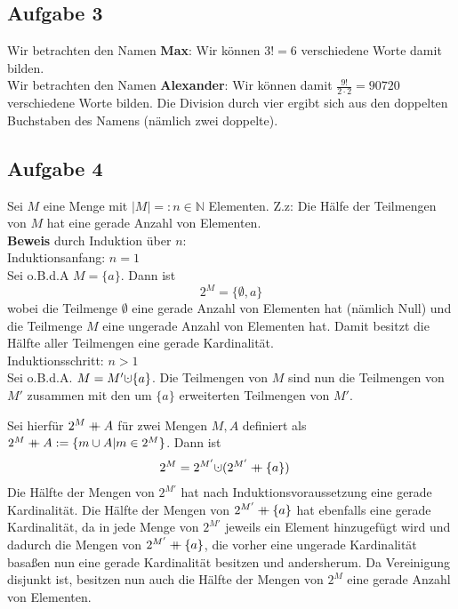 \documentclass[11pt,a4paper,ngerman]{article}
\newcommand\mdoubleplus{\ensuremath{\mathbin{+\mkern-10mu+}}}
\begin{document}
\subsection*{Aufgabe 3}

Wir betrachten den Namen \textbf{Max}: Wir können $3! = 6$ verschiedene Worte damit bilden.\\
Wir betrachten den Namen \textbf{Alexander}: Wir können damit $\frac{9!}{2\cdot 2} = 90720$ verschiedene Worte bilden. Die Division durch vier ergibt sich aus den doppelten Buchstaben des Namens (nämlich zwei doppelte).

\subsection*{Aufgabe 4}
Sei $M$ eine Menge mit $|M| =: n \in \mathbb{N}$ Elementen. Z.z: Die Hälfe der Teilmengen von $M$ hat eine gerade Anzahl von Elementen. \\
\textbf{Beweis} durch Induktion über $n$: \\
  Induktionsanfang: $n = 1$ \\
        Sei o.B.d.A $M = \{ a \}$. Dann ist
        \begin{equation*}
          2^M = \{\emptyset, {a} \}
        \end{equation*}
        wobei die Teilmenge $\emptyset$ eine gerade Anzahl von Elementen hat (nämlich Null) und
        die Teilmenge $M$ eine ungerade Anzahl von Elementen hat. Damit besitzt die Hälfte aller
        Teilmengen eine gerade Kardinalität. \\
        Induktionsschritt: $n > 1$ \\
        Sei o.B.d.A. $M = M' \mathaccent\cdot\cup \{ a \}$.
        Die Teilmengen von $M$ sind nun die Teilmengen von $M'$ zusammen mit den um $\{a\}$ 
        erweiterten Teilmengen von $M'$.
        
        Sei hierfür $2^M \mdoubleplus A$ für zwei Mengen $M,A$ definiert als
        $2^M \mdoubleplus A := \{m \cup A | m \in 2^M\} $. Dann ist
        \begin{equation*}\begin{split}
          2^M &= 2^{M'} \mathaccent\cdot\cup (2^{M'} \mdoubleplus \{a\})
        \end{split}\end{equation*}
        Die Hälfte der Mengen von $2^{M'}$ hat nach Induktionsvoraussetzung eine gerade
        Kardinalität. Die Hälfte der Mengen von $2^{M'} \mdoubleplus \{a\}$ hat ebenfalls
        eine gerade Kardinalität, da in jede Menge von $2^{M'}$ jeweils ein Element hinzugefügt
        wird und dadurch die Mengen von $2^{M'} \mdoubleplus \{a\}$,
        die vorher eine ungerade Kardinalität basaßen nun eine
        gerade Kardinalität besitzen und andersherum. Da Vereinigung disjunkt ist, 
        besitzen nun auch die Hälfte der Mengen von $2^M$ eine gerade Anzahl von Elementen.

\label{LastPage}
\end{document}
